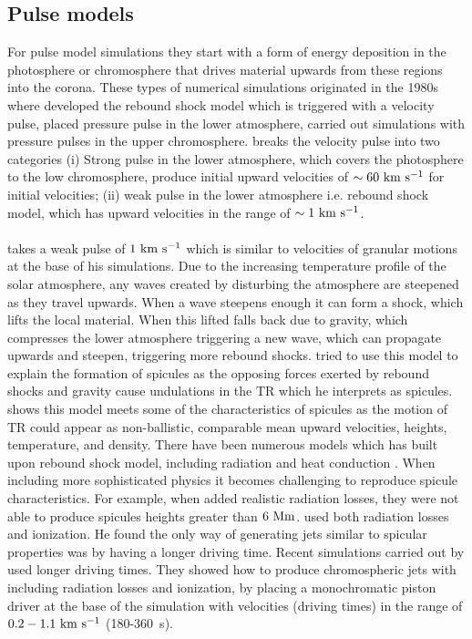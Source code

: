 \documentclass[12pt]{ociamthesis}
\newcommand{\kms}{~\rm{km ~s^{-1}}}
\newcommand{\np}{\\ \\}
\begin{document}
\subsection{Pulse models}
\label{ssec:pulse_model}
For pulse model simulations they start with a form of energy deposition in the photosphere or chromosphere that drives material upwards from these regions into the corona. These types of numerical simulations originated in the 1980s where \cite{Hollweg1982ApJ257345H} developed the rebound shock model which is triggered with a velocity pulse, \cite{Suematsu1982SoPh7599S} placed pressure pulse in the lower atmosphere, \cite{Shibata1982} carried out simulations with pressure pulses in the upper chromosphere. \cite{Sterling_2000SoPh} breaks the velocity pulse into two categories (i) Strong pulse in the lower atmosphere, which covers the photosphere to the low chromosphere, produce initial upward velocities of $\sim 60\kms$ for initial velocities; (ii) weak pulse in the lower atmosphere i.e. rebound shock model, which has upward velocities in the range of $\sim 1 \kms$.  \np
%
\cite{Hollweg1982ApJ257345H} takes a weak pulse of $1\kms$ which is similar to velocities of granular motions at the base of his simulations. Due to the increasing temperature profile of the solar atmosphere, any waves created by disturbing the atmosphere are steepened as they travel upwards. When a wave steepens enough it can form a shock, which lifts the local material. When this lifted falls back due to gravity, which compresses the lower atmosphere triggering a new wave, which can propagate upwards and steepen, triggering more rebound shocks. \cite{Hollweg1982ApJ257345H} tried to use this model to explain the formation of spicules as the opposing forces exerted by rebound shocks and gravity cause undulations in the TR which he interprets as spicules. \cite{Hollweg1982ApJ257345H} shows this model meets some of the characteristics of spicules as the motion of TR could appear as non-ballistic, comparable mean upward velocities, heights, temperature, and density. There have been numerous models which has built upon rebound shock model, including radiation and heat conduction \citep{Sterling1988ApJ327950S, Sterling1990ApJ349647S, Cheng1992AA266549C, Cheng1992AA262581C, Cheng1992AA266537C}. When including more sophisticated physics it becomes challenging to reproduce spicule characteristics. For example, when \cite{Sterling1990ApJ349647S} added realistic radiation losses, they were not able to produce spicules heights greater than $6~\rm{Mm}$. \cite{Cheng1992AA266549C, Cheng1992AA266537C} used both radiation losses and ionization. He found the only way of generating jets similar to spicular properties was by having a longer driving time. Recent simulations carried out by \cite{Heggland2007ApJ6661277H} used longer driving times. They showed how to produce chromospheric jets with including radiation losses and ionization, by placing a monochromatic piston driver at the base of the simulation with velocities (driving times) in the range of $0.2-1.1\kms$ (180-360~\rm{s}). \np
\end{document}
